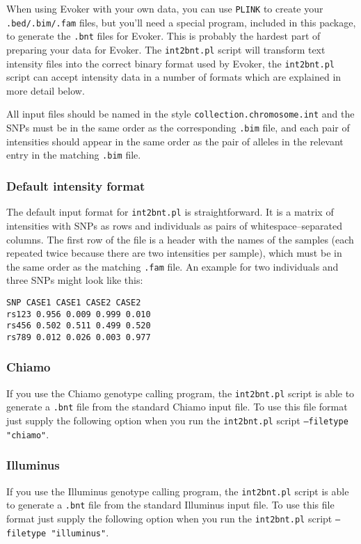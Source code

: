 \documentclass{article}
\begin{document}
When using Evoker with your own data, you can use \texttt{PLINK} to create your \texttt{.bed/.bim/.fam} files, but you'll need a special program, included in this package, to generate the \texttt{.bnt} files for Evoker. This is probably the hardest part of preparing your data for Evoker. The \texttt{int2bnt.pl} script will transform text intensity files into the correct binary format used by Evoker, the \texttt{int2bnt.pl} script can accept intensity data in a number of formats which are explained in more detail below.

All input files should be named in the style \texttt{collection.chromosome.int} and the SNPs must be in the same order as the corresponding \texttt{.bim} file, and each pair of intensities should appear in the same order as the pair of alleles in the relevant entry in the matching \texttt{.bim} file.

\subsubsection{Default intensity format}
The default input format for \texttt{int2bnt.pl} is straightforward. It is a matrix of intensities with SNPs as rows and individuals as pairs of whitespace--separated columns. The first row of the file is a header with the names of the samples (each repeated twice because there are two intensities per sample), which must be in the same order as the matching \texttt{.fam} file. An example for two individuals and three SNPs might look like this:

\begin{verbatim}
SNP CASE1 CASE1 CASE2 CASE2
rs123 0.956 0.009 0.999 0.010
rs456 0.502 0.511 0.499 0.520
rs789 0.012 0.026 0.003 0.977
\end{verbatim}

\subsubsection{Chiamo}
If you use the Chiamo genotype calling program, the \texttt{int2bnt.pl} script is able to generate a \texttt{.bnt} file from the standard Chiamo input file. To use this file format just supply the following option when you run the \texttt{int2bnt.pl} script \texttt{--filetype "chiamo"}.

\subsubsection{Illuminus}
If you use the Illuminus genotype calling program, the \texttt{int2bnt.pl} script is able to generate a \texttt{.bnt} file from the standard Illuminus input file. To use this file format just supply the following option when you run the \texttt{int2bnt.pl} script \texttt{--filetype "illuminus"}.
\end{document}

